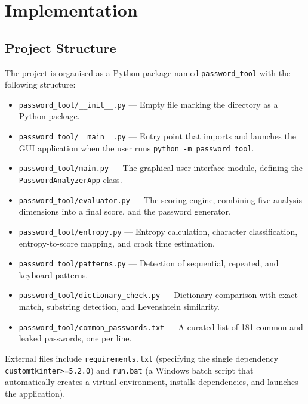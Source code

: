 
\clearpage

\chapter{Implementation}

\section{Project Structure}

The project is organised as a Python package named \texttt{password\_tool} with the following structure:

\begin{itemize}
    \item \texttt{password\_tool/\_\_init\_\_.py} --- Empty file marking the directory as a Python package.
    \item \texttt{password\_tool/\_\_main\_\_.py} --- Entry point that imports and launches the GUI application when the user runs \texttt{python -m password\_tool}.
    \item \texttt{password\_tool/main.py} --- The graphical user interface module, defining the \texttt{PasswordAnalyzerApp} class.
    \item \texttt{password\_tool/evaluator.py} --- The scoring engine, combining five analysis dimensions into a final score, and the password generator.
    \item \texttt{password\_tool/entropy.py} --- Entropy calculation, character classification, entropy-to-score mapping, and crack time estimation.
    \item \texttt{password\_tool/patterns.py} --- Detection of sequential, repeated, and keyboard patterns.
    \item \texttt{password\_tool/dictionary\_check.py} --- Dictionary comparison with exact match, substring detection, and Levenshtein similarity.
    \item \texttt{password\_tool/common\_passwords.txt} --- A curated list of 181 common and leaked passwords, one per line.
\end{itemize}

External files include \texttt{requirements.txt} (specifying the single dependency \texttt{customtkinter>=5.2.0}) and \texttt{run.bat} (a Windows batch script that automatically creates a virtual environment, installs dependencies, and launches the application).

